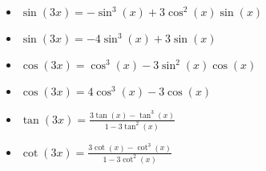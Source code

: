 \documentclass[12pt,a4paper,titlepage]{article}
\begin{document}
\begin{SummaryBox}[title=Trigonometric identities]
                \begin{SummaryExtensionBox}[title=Triple-angle identities]
                    \begin{multicols}{2}
                        \begin{itemize}[leftmargin=*]
                            \item $\sin(3x) = -\sin^3(x) + 3\cos^2(x)\sin(x)$
                            \item $\sin(3x) = -4\sin^3(x) + 3\sin(x)$
                            \item $\cos(3x) = \cos^3(x) - 3\sin^2(x)\cos(x)$
                            \item $\cos(3x) = 4\cos^3(x) - 3\cos(x)$
                            \item $\tan(3x) = \frac{3\tan(x) - \tan^3(x)}{1-3\tan^2(x)}$
                            \item $\cot(3x) = \frac{3\cot(x) - \cot^3(x)}{1-3\cot^2(x)}$
                        \end{itemize}
                    \end{multicols}
                \end{SummaryExtensionBox}
            \end{SummaryBox}
            
\end{document}
